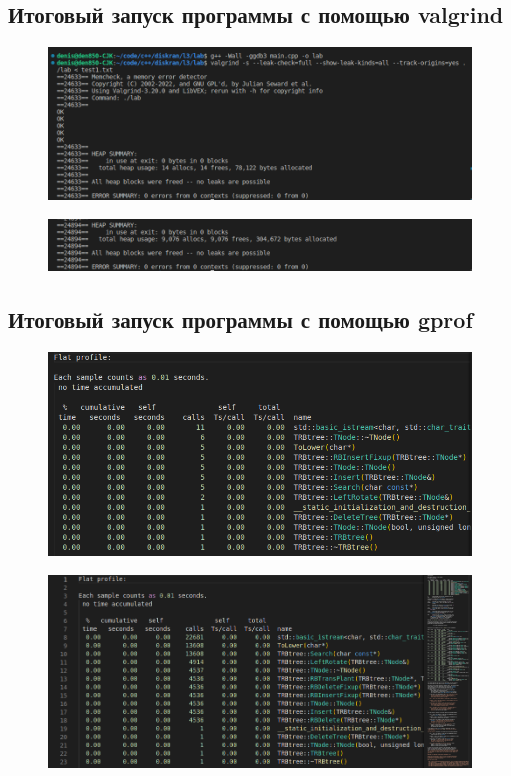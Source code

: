 \documentclass[12pt]{article}
\begin{document}
\subsection*{Итоговый запуск программы с помощью valgrind}

\begin{figure}[ht!]
    \includegraphics[width=.99\textwidth]{v1.png}
\end{figure}

\begin{figure}[ht!]
    \includegraphics[width=.99\textwidth]{v2.png}
\end{figure}

\subsection*{Итоговый запуск программы с помощью gprof}

\begin{figure}[ht!]
    \includegraphics[width=.99\textwidth]{g1.png}
\end{figure}

\begin{figure}[ht!]
    \includegraphics[width=.99\textwidth]{g2.png}
\end{figure}
\end{document}

